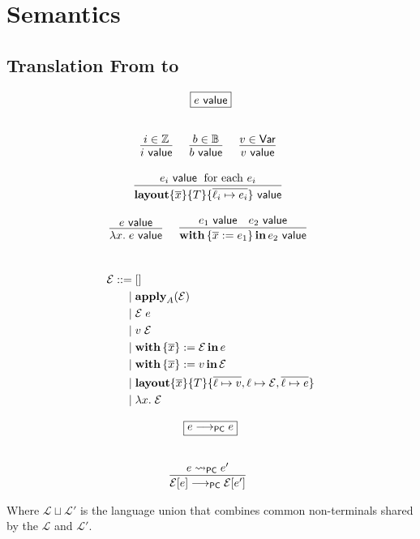 \section{Semantics}

\subsection{Translation From \Pika{} to \PikaCore}


\[
  \begin{array}{c}
    \fbox{$e ~\val$}
    \fboxNewlines
    \labinfer{i ~\val}{i \in \mathbb{Z}}
    ~~~
    \labinfer{b ~\val}{b \in \mathbb{B}}
    ~~~
    \labinfer{v ~\val}{v \in \Var}
    \\\\
    \labinfer{\sslmath{\overline{x}}{T}{\overline{\ell_i \mapsto e_i}} ~\val}
      {e_i ~\val \;\textrm{ for each $e_i$}}
    \\\\
    \labinfer{\lambda x.\; e ~\val}{e ~\val}
    ~~~
    \labinfer{\withIn{\{\overline{x} := e_1\}} e_2 ~\val}
      {e_1 ~\val & e_2 ~\val}
  \end{array}
\]
\\

\[
  \begin{aligned}
  \mathcal{E}
    ::=\; &[]\\
    \mid\; &\textbf{apply}_A(\mathcal{E})\\
    \mid\; &\mathcal{E}\; e\\
    \mid\; &v\; \mathcal{E}\\
    \mid\; &\textbf{with}\,\{ \overline{x} \} := \mathcal{E}\,\textbf{in}\, e\\
    \mid\; &\textbf{with}\,\{ \overline{x} \} := v\,\textbf{in}\, \mathcal{E}\\
    \mid\; &\textbf{layout}\{ \overline{x} \}\{ T \}\{ \overline{\ell \mapsto v}, \ell \mapsto \mathcal{E}, \overline{\ell \mapsto e} \}\\
    \mid\; &\lambda x.\; \mathcal{E}
  \end{aligned}
\]

\[
  \begin{array}{c}
    \fbox{$e \pcstep e$}
    \fboxNewlines
    \labinfer{\mathcal{E}[e] \pcstep \mathcal{E}[e']}
      {e \pcNotionStep e'}
  \end{array}
\]

Where $\mathcal{L} \sqcup \mathcal{L}'$ is the language union that combines common non-terminals shared by the $\mathcal{L}$ and $\mathcal{L}'$.

